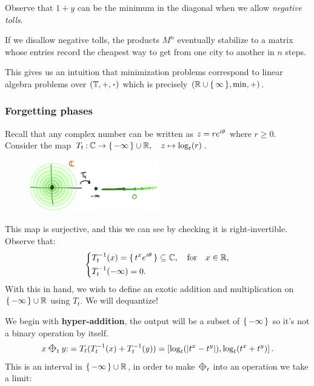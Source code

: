 \documentclass[12pt]{memoir}
\newcommand{\diamondplus}{\mathbin{\rotatebox[origin=c]{45}{$\boxtimes$}}} %
\begin{document}
Observe that $1+y$ can be the minimum in the diagonal when we allow \emph{negative tolls}.
\begin{Rmk}
If we disallow negative tolls, the products $M^n$ eventually stabilize to a matrix whose entries record the cheapest way to get from one city to another in $n$ steps.
\end{Rmk}
This gives us an intuition that minimization problems correspond to linear algebra problems over $(\bT,+,\.)$ which is precisely $(\mathbb{R}\cup\{\,\infty\,\},\min,+)$.

\subsubsection{Forgetting phases}

Recall that any complex number can be written as $z=re^{i\theta}$ where $r\geq 0$. Consider the map $T_t\mathbin{:}\mathbb{C}\to\{\,-\infty\,\}\cup\mathbb{R},\quad z\mapsto\log_t(r)$.
\begin{figure}[h!]
    \centering
    \includegraphics[width=0.5\textwidth]{figs/fig1.3.png}
\end{figure}
This map is surjective, and this we can see by checking it is right-invertible. Observe that:
$$
\left\lbrace
\begin{aligned}
    &T_t^{-1}(x)=\{\,t^xe^{i\theta}\,\}\subseteq\mathbb{C},\quad\text{for}\quad x\in\mathbb{R},\\
    &T_t^{-1}(-\infty)=0.
\end{aligned}
\right.
$$
With this in hand, we wish to define an exotic addition and multiplication on $\{\,-\infty\,\}\cup\mathbb{R}$ using $T_t$. We will dequantize!\par 
We begin with \textbf{hyper-addition}, the output will be a subset of $\{\,-\infty\,\}$ so it's not a binary operation by itself. 
$$x\diamondplus_t y\:= T_t(T_t^{-1}(x)+T_t^{-1}(y))=\bonj{\log_t(|t^x-t^y|),\log_t(t^x+t^y)}.$$
This is an interval in $\{\,-\infty\,\}\cup\mathbb{R}$, in order to make $\diamondplus_t$ into an operation we take a limit:
\end{document}
